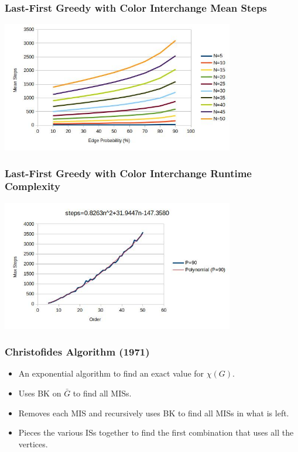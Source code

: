 \documentclass{beamer}
\newcommand{\X}{\chi}
\begin{document}
\begin{frame}
  \frametitle{Last-First Greedy with Color Interchange Mean Steps}
  \begin{center}
    \includegraphics[width=4in]{../final/greedyint_steps}
  \end{center}
\end{frame}

\begin{frame}
  \frametitle{Last-First Greedy with Color Interchange Runtime Complexity}
  \begin{center}
    \includegraphics[width=4in]{../final/greedyint_runtime}
  \end{center}
\end{frame}

\begin{frame}
  \frametitle{Christofides Algorithm (1971)}
  \begin{itemize}
  \item An exponential algorithm to find an exact value for \(\X(G)\).
  \item Uses BK on \(\bar{G}\) to find all MISs.
  \item Removes each MIS and recursively uses BK to find all MISs in what is left.
  \item Pieces the various ISs together to find the first combination that uses all the vertices.
  \end{itemize}
\end{frame}
\end{document}
